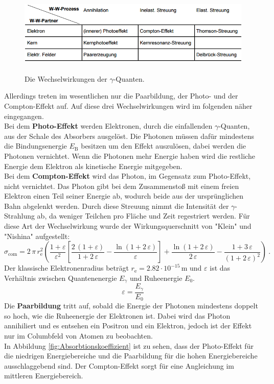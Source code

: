 \begin{figure}[H]
	\centering
	\includegraphics[height=4cm]{picture/Wechselwirkungen.PNG}
	\caption{Die Wechselwirkungen der $\gamma$-Quanten. \cite[4]{sample}}
	\label{fig:Wechselwirkungen}
\end{figure}

Allerdings treten im wesentlichen nur die Paarbildung, der Photo- und der Compton-Effekt auf. Auf diese drei Wechselwirkungen wird im folgenden näher eingegangen. \\
Bei dem \textbf{Photo-Effekt} werden Elektronen, durch die einfallenden $\gamma$-Quanten, aus der Schale des Absorbers ausgelöst. Die Photonen müssen dafür mindestens die Bindungsenergie $E_\text{B}$ besitzen um den Effekt auszulösen, dabei werden die Photonen vernichtet. Wenn die Photonen mehr Energie haben wird die restliche Energie dem Elektron als kinetische Energie mitgegeben. \\
Bei dem \textbf{Compton-Effekt} wird das Photon, im Gegensatz zum Photo-Effekt, nicht vernichtet. Das Photon gibt bei dem Zusammenstoß mit einem freien Elektron einen Teil seiner Energie ab, wodurch beide aus der ursprünglichen Bahn abgelenkt werden. Durch diese Streuung nimmt die Intensität der $\gamma$-Strahlung ab, da weniger Teilchen pro Fläche und Zeit regestriert werden. Für diese Art der Wechselwirkung wurde der Wirkungsquerschnitt von "Klein" und "Nishina" aufgestellt:
\begin{equation}
	\sigma_\text{com} = 2\,\pi\,r^2_\text{e} \left( \frac{1+\varepsilon}{\varepsilon^2} \left[\frac{2\,(1+\varepsilon)}{1+2\,\varepsilon} - \frac{\ln(1+2\,\varepsilon)}{\varepsilon} \right] + \frac{\ln(1+2\,\varepsilon)}{2\,\varepsilon} - \frac{1+3\,\varepsilon}{(1+2\,\varepsilon)^2} \right) \ .
	\label{eqn:Sigma}
\end{equation}
Der klassische Elektronenradius beträgt $r_\text{e} = 2.82 \cdot 10^{-15}$\,m und $\varepsilon$ ist das Verhältnis zwischen Quantenenergie $E_\gamma$ und Ruheenergie $E_0$.
\begin{equation}
	\varepsilon = \frac{E_\gamma}{E_0}
	\label{eqn:VarE}
\end{equation}
Die \textbf{Paarbildung} tritt auf, sobald die Energie der Photonen mindestens doppelt so hoch, wie die Ruheenergie der Elektronen ist. Dabei wird das Photon annihiliert und es entsehen ein Positron und ein Elektron, jedoch ist der Effekt nur im Columbfeld von Atomen zu beobachten.\\
In Abbildung \eqref{fig:Absorbtionskoeffizient} ist zu sehen, dass der Photo-Effekt für die niedrigen Energiebereiche und die Paarbildung für die hohen Energiebereiche ausschlaggebend sind. Der Compton-Effekt sorgt für eine Angleichung im mittleren Energiebereich.


